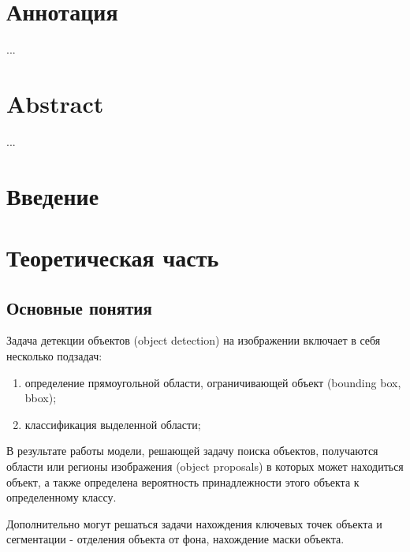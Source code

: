 \documentclass[a4paper,14pt]{article}
\begin{document}
    

    \section*{\normalsize \hfill Аннотация \hfill}

    ...

    \sloppy
    \newpage

    \section*{\normalsize \hfill Abstract \hfill}

    ...

    \newpage

    \tableofcontents
    \pagebreak

    \section*{Введение}


    \newpage


    \section{Теоретическая часть}

    \subsection{Основные понятия}

    Задача детекции объектов (object detection) на изображении включает в себя несколько подзадач:
    \begin{enumerate}
        [1)]
        \itemsep0em
        \item определение прямоугольной области, ограничивающей объект (bounding box, bbox);
        \item классификация выделенной области;
    \end{enumerate}
    В результате работы модели, решающей задачу поиска объектов, получаются области или регионы изображения (object proposals) в которых может находиться объект, а также определена вероятность принадлежности этого объекта к определенному классу.

    Дополнительно могут решаться задачи нахождения ключевых точек объекта и сегментации - отделения объекта от фона, нахождение маски объекта.
\end{document}
